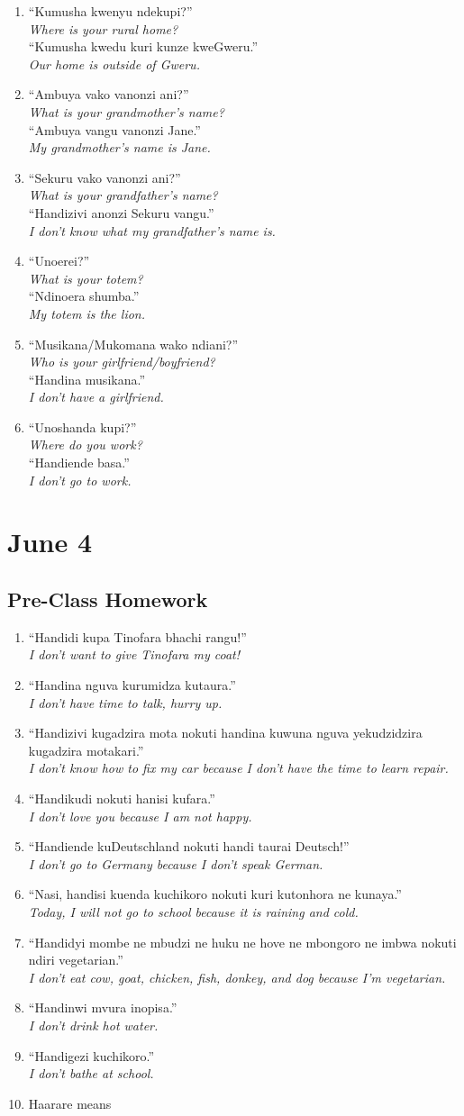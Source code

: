 \documentclass[12pt]{article}
\newcommand{\tl}[2]{``#1''\\\textit{#2}}
\newcommand{\resp}[4]{%
  \tl{#1}{#2} \\
  \tl{#3}{#4}
}
\begin{document}
\begin{enumerate}
\item \resp{Kumusha kwenyu ndekupi?}{Where is your rural home?}{Kumusha kwedu kuri kunze kweGweru.}{Our home is outside of Gweru.}
\item \resp{Ambuya vako vanonzi ani?}{What is your grandmother's name?}{Ambuya vangu vanonzi Jane.}{My grandmother's name is Jane.}
\item \resp{Sekuru vako vanonzi ani?}{What is your grandfather's name?}{Handizivi anonzi Sekuru vangu.}{I don't know what my grandfather's name is.}
\item \resp{Unoerei?}{What is your totem?}{Ndinoera shumba.}{My totem is the lion.}
\item \resp{Musikana/Mukomana wako ndiani?}{Who is your girlfriend/boyfriend?}{Handina musikana.}{I don't have a girlfriend.}
\item \resp{Unoshanda kupi?}{Where do you work?}{Handiende basa.}{I don't go to work.}
\end{enumerate}

\section{June 4}
\subsection{Pre-Class Homework}
\begin{enumerate}
\item \tl{Handidi kupa Tinofara bhachi rangu!}{I don't want to give Tinofara my coat!}
\item \tl{Handina nguva kurumidza kutaura.}{I don't have time to talk, hurry up.}
\item \tl{Handizivi kugadzira mota nokuti handina kuwuna nguva yekudzidzira kugadzira motakari.}{I don't know how to fix my car because I don't have the time to learn repair.}
\item \tl{Handikudi nokuti hanisi kufara.}{I don't love you because I am not happy.}
\item \tl{Handiende kuDeutschland nokuti handi taurai Deutsch!}{I don't go to Germany because I don't speak German.}
\item \tl{Nasi, handisi kuenda kuchikoro nokuti kuri kutonhora ne kunaya.}{Today, I will not go to school because it is raining and cold.}
\item \tl{Handidyi mombe ne mbudzi ne huku ne hove ne mbongoro ne imbwa nokuti ndiri vegetarian.}{I don't eat cow, goat, chicken, fish, donkey, and dog because I'm vegetarian.}
\item \tl{Handinwi mvura inopisa.}{I don't drink hot water.}
\item \tl{Handigezi kuchikoro.}{I don't bathe at school.}
\item Haarare means
\end{enumerate}
\end{document}
